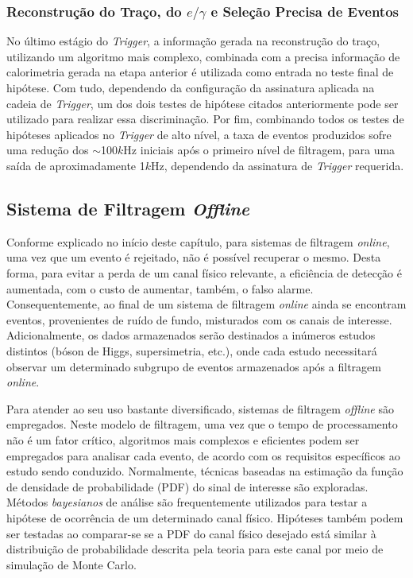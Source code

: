 \subsubsection{Reconstrução do Traço, do $e/\gamma$ e Seleção Precisa de Eventos}

No último estágio do \textit{Trigger}, a informação gerada na reconstrução do traço, utilizando um algoritmo mais complexo, combinada com a precisa informação de calorimetria gerada na etapa anterior 
é utilizada como entrada no teste final de hipótese. Com tudo, dependendo da configuração da assinatura aplicada na cadeia de \textit{Trigger}, um dos dois testes de hipótese
citados anteriormente pode ser utilizado para realizar essa discriminação. Por fim, combinando todos os testes de hipóteses aplicados no  \textit{Trigger} de alto nível, a taxa de eventos 
produzidos sofre uma redução dos $\sim$100$k$Hz iniciais após o primeiro nível de filtragem, para uma saída de aproximadamente 1$k$Hz, dependendo da assinatura de \textit{Trigger} requerida. 

\subsection{Sistema de Filtragem \textit{Offline}}

Conforme explicado no início deste capítulo, para sistemas de filtragem \textit{online}, uma vez que um evento é rejeitado, não é possível recuperar o mesmo. Desta forma,
para evitar a perda de um canal físico relevante, a eficiência de detecção é aumentada, com o custo de aumentar, também, o falso alarme. Consequentemente, ao final de um sistema
de filtragem \textit{online} ainda se encontram eventos, provenientes de ruído de fundo, misturados com os canais de interesse. Adicionalmente, os dados armazenados serão destinados
a inúmeros estudos distintos (bóson de Higgs, supersimetria, etc.), onde cada estudo necessitará observar um determinado subgrupo de eventos armazenados após a filtragem \textit{online}.

Para atender ao seu uso bastante diversificado, sistemas de filtragem \textit{offline} são empregados. Neste modelo de filtragem, uma vez que o tempo de processamento
não é um fator crítico, algoritmos mais complexos e eficientes podem ser empregados para analisar cada evento, de acordo com os requisitos específicos ao estudo sendo conduzido. Normalmente,
técnicas baseadas na estimação da função de densidade de probabilidade (PDF) do sinal de interesse são exploradas. Métodos \textit{bayesianos} de análise são frequentemente utilizados para testar
a hipótese de ocorrência de um determinado canal físico. Hipóteses também podem ser testadas ao comparar-se se a PDF do canal físico desejado está similar à distribuição de probabilidade
descrita pela teoria para este canal por meio de simulação de Monte Carlo. 

